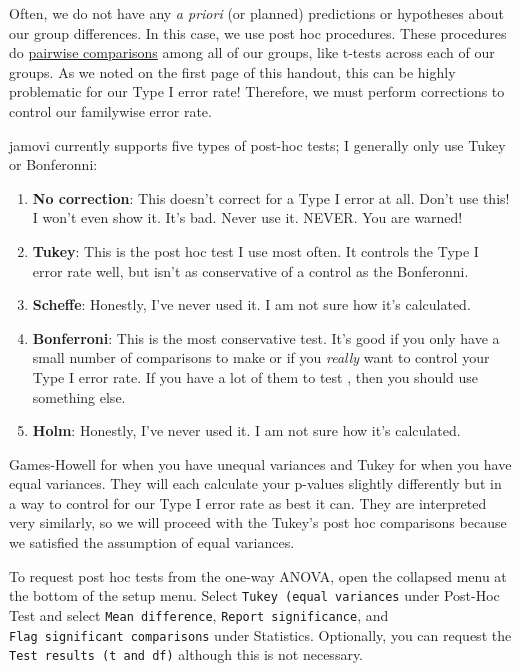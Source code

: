 \documentclass[
]{book}
\providecommand{\tightlist}{%
  \setlength{\itemsep}{0pt}\setlength{\parskip}{0pt}}
\begin{document}
Often, we do not have any \emph{a priori} (or planned) predictions or hypotheses about our group differences. In this case, we use post hoc procedures. These procedures do \underline{pairwise comparisons} among all of our groups, like t-tests across each of our groups. As we noted on the first page of this handout, this can be highly problematic for our Type I error rate! Therefore, we must perform corrections to control our familywise error rate.

jamovi currently supports five types of post-hoc tests; I generally only use Tukey or Bonferonni:

\begin{enumerate}
\def\labelenumi{\arabic{enumi}.}
\tightlist
\item
  \textbf{No correction}: This doesn't correct for a Type I error at all. Don't use this! I won't even show it. It's bad. Never use it. NEVER. You are warned!
\item
  \textbf{Tukey}: This is the post hoc test I use most often. It controls the Type I error rate well, but isn't as conservative of a control as the Bonferonni.
\item
  \textbf{Scheffe}: Honestly, I've never used it. I am not sure how it's calculated.
\item
  \textbf{Bonferroni}: This is the most conservative test. It's good if you only have a small number of comparisons to make or if you \emph{really} want to control your Type I error rate. If you have a lot of them to test , then you should use something else.
\item
  \textbf{Holm}: Honestly, I've never used it. I am not sure how it's calculated.
\end{enumerate}

Games-Howell for when you have unequal variances and Tukey for when you have equal variances. They will each calculate your p-values slightly differently but in a way to control for our Type I error rate as best it can. They are interpreted very similarly, so we will proceed with the Tukey's post hoc comparisons because we satisfied the assumption of equal variances.

To request post hoc tests from the one-way ANOVA, open the collapsed menu at the bottom of the setup menu. Select \texttt{Tukey\ (equal\ variances} under Post-Hoc Test and select \texttt{Mean\ difference}, \texttt{Report\ significance}, and \texttt{Flag\ significant\ comparisons} under Statistics. Optionally, you can request the \texttt{Test\ results\ (t\ and\ df)} although this is not necessary.
\end{document}
